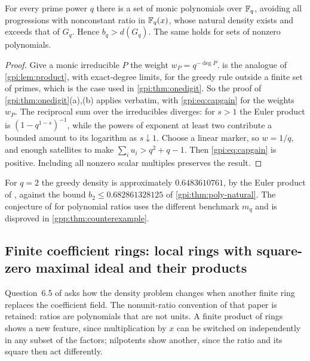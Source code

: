 \begin{proposition}\label{gpi:prop:poly-greedy}
For every prime power $q$ there is a set of monic polynomials over $\mathbb{F}_q$, avoiding all
progressions with nonconstant ratio in $\mathbb{F}_q(x)$, whose natural density exists and exceeds
that of $G_q$. Hence $b_q>d(G_q)$. The same holds for sets of nonzero polynomials.
\end{proposition}

\begin{proof}
Give a monic irreducible $P$ the weight $w_P=q^{-\deg P}$.  is the
analogue of \cref{gpi:lem:product}, with exact-degree limits, for the greedy rule outside a
finite set of primes, which is the case used in \cref{gpi:thm:onedigit}. So the proof of
\cref{gpi:thm:onedigit}(a),(b) applies verbatim, with \eqref{gpi:eq:capgain} for the weights
$w_P$. The reciprocal sum over the irreducibles diverges: for $s>1$ the Euler product is
$(1-q^{1-s})^{-1}$, while the powers of exponent at least two contribute a bounded amount to
its logarithm as $s\downarrow1$. Choose a linear marker, so $w=1/q$, and enough satellites to
make $\sum_iu_i>q^2+q-1$. Then \eqref{gpi:eq:capgain} is positive. Including all nonzero
scalar multiples preserves the result.
\end{proof}

For $q=2$ the greedy density is approximately $0.6483610761$, by the Euler product of
\cite{Asada2017Subsets}, against the bound $b_2\le0.682861328125$ of
\cref{gpi:thm:poly-natural}. The conjecture of \cite{Asada2017Subsets} for polynomial ratios
uses the different benchmark $m_q$ and is disproved in \cref{gpp:thm:counterexample}.

\subsection{Finite coefficient rings: local rings with square-zero maximal ideal and their products}\label{gpp:sec:rings}
{\raggedright{}}

Question~6.5 of \cite{Asada2017Subsets} asks how the density problem changes when another
finite ring replaces the coefficient field. The nonunit-ratio convention of that paper is
retained: ratios are polynomials that are not units. A finite product of rings shows a new
feature, since multiplication by $x$ can be switched on independently in any subset of the
factors; nilpotents show another, since the ratio and its square then act differently.

